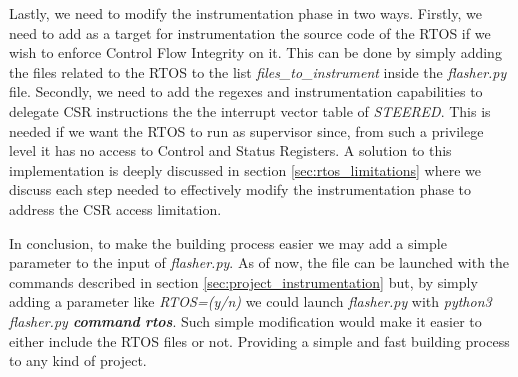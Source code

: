 Lastly, we need to modify the instrumentation phase in two ways. Firstly, we
need to add as a target for instrumentation the source code of the RTOS if we
wish to enforce Control Flow Integrity on it. This can be done by simply adding the
files related to the RTOS to the list \textit{files\_to\_instrument} inside the
\textit{flasher.py} file. Secondly, we need to add the regexes and instrumentation
capabilities to delegate CSR instructions the the interrupt vector table of \textit{STEERED}.
This is needed if we want the RTOS to run as supervisor since, from such a
privilege level it has no access to Control and Status Registers. A solution to this
implementation is deeply discussed in section \ref{sec:rtos_limitations} where we
discuss each step needed to effectively modify the instrumentation phase to address
the CSR access limitation.

In conclusion, to make the building process easier we may add a simple parameter
to the input of \textit{flasher.py}. As of now, the file can be launched with the
commands described in section \ref{sec:project_instrumentation} but, by simply
adding a parameter like \textit{RTOS=(y/n)} we could launch \textit{flasher.py}
with \textit{python3 flasher.py \textbf{command} \textbf{rtos}}. Such simple
modification would make it easier to either include the RTOS files or not. Providing
a simple and fast building process to any kind of project.